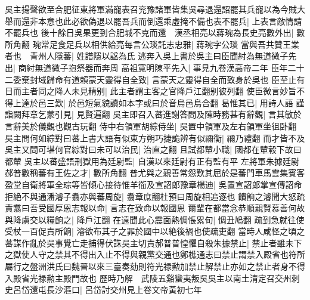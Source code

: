 吳主揚聲欲至合肥征東將軍滿寵表召兖豫諸軍皆集吳尋退還詔罷其兵寵以為今賊大舉而還非本意也此必欲偽退以罷吾兵而倒還乘虛掩不備也表不罷兵|{
	上表言敵情請不罷兵也}
後十餘日吳果更到合肥城不克而還　漢丞相亮以蔣琬為長史亮數外出|{
	數所角翻}
琬常足食足兵以相供給亮每言公琰託志忠雅|{
	蔣琬字公琰}
當與吾共贊王業者也　青州人隱蕃|{
	姓譜隱以諡為氏}
逃奔入吳上書於吳主曰臣聞紂為無道微子先出|{
	商紂無道微子抱祭器而奔周}
高祖寛明陳平先入|{
	事見九卷漢高帝二年}
臣年二十二委棄封域歸命有道賴蒙天靈得自全致|{
	言蒙天之靈得自全而致身於吳也}
臣至止有日而主者同之降人未見精别|{
	此主者謂主客之官降戶江翻别彼列翻}
使臣微言妙旨不得上達於邑三歎|{
	於邑短氣貌讀如本字或曰於音烏邑烏合翻}
曷惟其已|{
	用詩人語}
謹詣闕拜章乞蒙引見|{
	見賢遍翻}
吳主即召入蕃進謝答問及陳時務甚有辭觀|{
	言其敏於言辭美於儀觀也觀古玩翻}
侍中右領軍胡綜侍坐|{
	吳置中領軍及左右領軍坐徂卧翻}
吳主問何如綜對曰蕃上書大語有似東方朔巧捷詭辨有似禰衡|{
	禰乃禮翻}
而才皆不及吳主又問可堪何官綜對曰未可以治民|{
	治直之翻}
且試都輦小職|{
	國都在輦轂下故曰都輦}
吳主以蕃盛語刑獄用為廷尉監|{
	自漢以來廷尉有正有監有平}
左將軍朱據廷尉郝普數稱蕃有王佐之才|{
	數所角翻}
普尤與之親善常怨歎其屈於是蕃門車馬雲集賓客盈堂自衛將軍全琮等皆傾心接待惟羊衜及宣詔郎豫章楊迪|{
	吳置宣詔郎掌宣傳詔命}
拒絶不與通潘濬子翥亦與蕃周旋|{
	翥章庶翻杜預曰周旋相追逐也}
饋餉之濬聞大怒疏責翥曰吾受國厚恩志報以命|{
	言志在致命以報國恩}
爾輩在都當念恭順親賢慕善何故與降虜交以糧餉之|{
	降戶江翻}
在遠聞此心震面熱惆悵累旬|{
	惆丑鳩翻}
疏到急就往使受杖一百促責所餉|{
	濬欲布其子之罪於國中以絶後禍也使疏吏翻}
當時人咸怪之頃之蕃謀作亂於吳事覺亡走捕得伏誅吳主切責郝普普惶懼自殺朱據禁止|{
	禁止者雖未下之獄使人守之禁其不得出入止不得與親黨交通也鄭樵通志曰禁止謂禁入殿省也符所屬行之盤洲洪氏曰魏晉以來三臺奏劾則符光禄勲加禁止解禁止亦如之禁止者身不得入殿省光禄勲主殿門故也}
歷時乃解　武陵五谿蠻夷叛吳吳主以南土清定召交州刺史呂岱還屯長沙漚口|{
	呂岱討交州見上卷文帝黃初七年}


